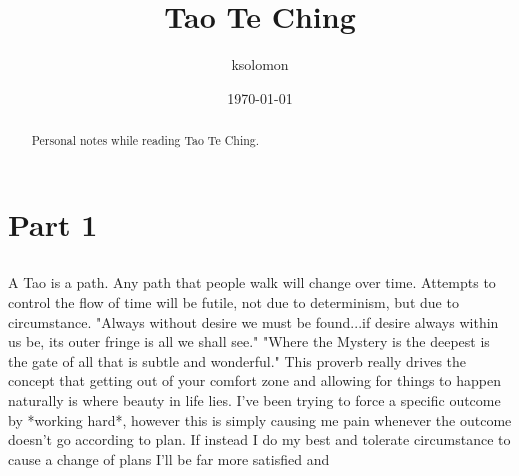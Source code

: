\documentclass[a4paper, 10pt]{article}
\title{Tao Te Ching}
\author{ksolomon}
\date{\today}
\begin{document}
\maketitle

\begin{abstract}
	Personal notes while reading Tao Te Ching.
\end{abstract}



\section{Part 1}
\subsection{}
A Tao is a path. Any path that people walk will change over time. Attempts to control the flow of time will be futile, not due to determinism, but due to circumstance. "Always without desire we must be found...if desire always within us be, its outer fringe is all we shall see." "Where the Mystery is the deepest is the gate of all that is subtle and wonderful." This proverb really drives the concept that getting out of your comfort zone and allowing for things to happen naturally is where beauty in life lies. I've been trying to force a specific outcome by *working hard*, however this is simply causing me pain whenever the outcome doesn't go according to plan. If instead I do my best and tolerate circumstance to cause a change of plans I'll be far more satisfied and
\end{document}
